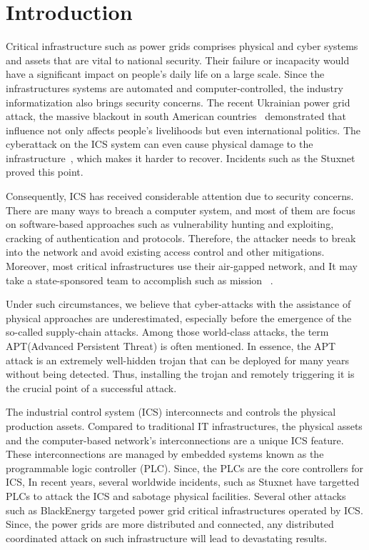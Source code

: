 \section{Introduction}
\label{sec:implant-introduction}

Critical infrastructure such as power grids comprises physical and cyber systems and assets that are vital to national security. Their failure or incapacity would have a significant impact on people's daily life on a large scale. Since the infrastructures systems are automated and computer-controlled, the industry informatization also brings security concerns. The recent Ukrainian power grid attack, the massive blackout in south American countries~\cite{haes2019survey} demonstrated that influence not only affects people's livelihoods but even international politics. The cyberattack on the ICS system can even cause physical damage to the infrastructure~\cite{zeller2011myth}, which makes it harder to recover. Incidents such as the Stuxnet proved this point. 

Consequently, ICS has received considerable attention due to security concerns. There are many ways to breach a computer system, and most of them are focus on software-based approaches such as vulnerability hunting and exploiting, cracking of authentication and protocols. Therefore, the attacker needs to break into the network and avoid existing access control and other mitigations. Moreover, most critical infrastructures use their air-gapped network, and It may take a state-sponsored team to accomplish such as mission ~\cite{langner2011stuxnet}. 

Under such circumstances, we believe that cyber-attacks with the assistance of physical approaches are underestimated, especially before the emergence of the so-called supply-chain attacks. Among those world-class attacks, the term APT(Advanced Persistent Threat) is often mentioned. In essence, the APT attack is an extremely well-hidden trojan that can be deployed for many years without being detected. Thus, installing the trojan and remotely triggering it is the crucial point of a successful attack.

The industrial control system (ICS) interconnects and controls the physical production assets. Compared to traditional IT infrastructures, the physical assets and the computer-based network's interconnections are a unique ICS feature. These interconnections are managed by embedded systems known as the programmable logic controller (PLC). Since, the PLCs are the core controllers for ICS, In recent years, several worldwide incidents, such as Stuxnet \cite{langner2011stuxnet} have targetted PLCs to attack the ICS and sabotage physical facilities. Several other attacks such as BlackEnergy \cite{cherepanov2016blackenergy, case2016analysis, soltan2016power, zhang2013time, williams2016power} targeted power grid critical infrastructures operated by ICS. Since, the power grids are more distributed and connected, any distributed coordinated attack on such infrastructure will lead to devastating results.

